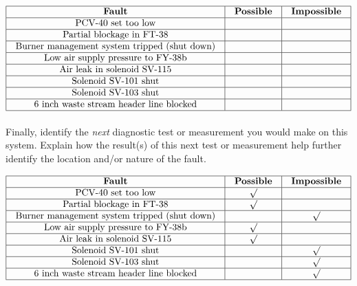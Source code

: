 $$\vbox{\offinterlineskip
\halign{\strut
\vrule \quad\hfil # \ \hfil & 
\vrule \quad\hfil # \ \hfil & 
\vrule \quad\hfil # \ \hfil \vrule \cr
\noalign{\hrule}
%
{\bf Fault} & {\bf Possible} & {\bf Impossible} \cr
%
\noalign{\hrule}
%
PCV-40 set too low &  &  \cr
%
\noalign{\hrule}
%
Partial blockage in FT-38 &  &  \cr
%
\noalign{\hrule}
%
Burner management system tripped (shut down) &  &  \cr
%
\noalign{\hrule}
%
Low air supply pressure to FY-38b &  &  \cr
%
\noalign{\hrule}
%
Air leak in solenoid SV-115 &  &  \cr
%
\noalign{\hrule}
%
Solenoid SV-101 shut &  &  \cr
%
\noalign{\hrule}
%
Solenoid SV-103 shut &  &  \cr
%
\noalign{\hrule}
%
6 inch waste stream header line blocked &  &  \cr
%
\noalign{\hrule}
} %
}$$ %

Finally, identify the {\it next} diagnostic test or measurement you would make on this system.  Explain how the result(s) of this next test or measurement help further identify the location and/or nature of the fault.








$$\vbox{\offinterlineskip
\halign{\strut
\vrule \quad\hfil # \ \hfil & 
\vrule \quad\hfil # \ \hfil & 
\vrule \quad\hfil # \ \hfil \vrule \cr
\noalign{\hrule}
%
{\bf Fault} & {\bf Possible} & {\bf Impossible} \cr
%
\noalign{\hrule}
%
PCV-40 set too low & $\surd$ &  \cr
%
\noalign{\hrule}
%
Partial blockage in FT-38 & $\surd$ &  \cr
%
\noalign{\hrule}
%
Burner management system tripped (shut down) &  & $\surd$ \cr
%
\noalign{\hrule}
%
Low air supply pressure to FY-38b & $\surd$ &  \cr
%
\noalign{\hrule}
%
Air leak in solenoid SV-115 & $\surd$ &  \cr
%
\noalign{\hrule}
%
Solenoid SV-101 shut &  & $\surd$ \cr
%
\noalign{\hrule}
%
Solenoid SV-103 shut &  & $\surd$ \cr
%
\noalign{\hrule}
%
6 inch waste stream header line blocked &  & $\surd$ \cr
%
\noalign{\hrule}
} %
}$$ %






